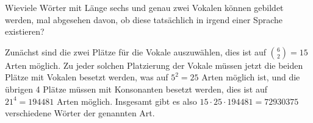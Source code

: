 Wieviele Wörter mit Länge sechs und genau zwei Vokalen können
gebildet werden,
mal abgesehen davon, ob diese tatsächlich in irgend einer Sprache
existieren?

\begin{loesung}
Zunächst sind die zwei Plätze für die Vokale auszuwählen, dies
ist auf $\binom{6}{2}=15$ Arten möglich. Zu jeder solchen Platzierung
der Vokale müssen jetzt die beiden Plätze mit Vokalen besetzt
werden, was auf $5^2=25$ Arten möglich ist, und die übrigen 4 Plätze
müssen mit Konsonanten besetzt werden, dies ist auf $21^4=194481$
Arten möglich.
Insgesamt gibt es also $15\cdot 25\cdot 194481=72930375$
verschiedene Wörter der genannten Art.
\end{loesung}

